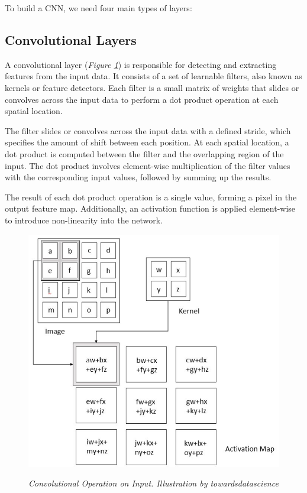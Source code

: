 To build a CNN, we need four main types of layers:

\subsection{Convolutional Layers}

A convolutional layer (\textit{Figure \ref{fig:convolutional-layer}}) is
responsible for detecting and extracting features from the input data. It
consists of a set of learnable filters, also known as kernels or feature
detectors. Each filter is a small matrix of weights that slides or convolves
across the input data to perform a dot product operation at each spatial
location.  \newline

The filter slides or convolves across the input data with a defined stride,
which specifies the amount of shift between each position. At each spatial
location, a dot product is computed between the filter and the overlapping
region of the input. The dot product involves element-wise multiplication of
the filter values with the corresponding input values, followed by summing up
the results. \newline

The result of each dot product operation is a single value, forming a pixel in
the output feature map. Additionally, an activation function is applied
element-wise to introduce non-linearity into the network.

\begin{figure}[H] \centering
  \begin{adjustbox}{width=0.75\textwidth, trim={0cm 0cm 0cm 0.35cm}, clip}
  \includegraphics[]{imatges/preliminaries/convolutional-layer.png}
  \end{adjustbox}
  \caption[Convolutional Operation on Input]{\textit{Convolutional
  Operation on Input. Illustration by towardsdatascience}}
{\label{fig:convolutional-layer}} \end{figure}

